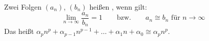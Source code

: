 Zwei Folgen $(a_n)$, $(b_n)$ heißen , wenn gilt:
$$
\lim_{n \to \infty} \frac{a_n}{b_n} = 1
\qquad \text{bzw.} \qquad
\text{$a_n \cong b_n$ für $n \to \infty$}
$$
Das heißt $\alpha_p n^p + \alpha_{p-1} n^{p-1} + \dots + \alpha_1 n  + \alpha_0 \cong \alpha_p n^p$.